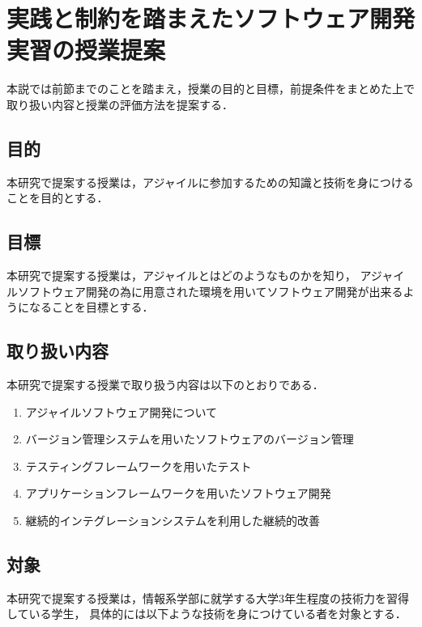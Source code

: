 \section{実践と制約を踏まえたソフトウェア開発実習の授業提案}

本説では前節までのことを踏まえ，授業の目的と目標，前提条件をまとめた上で取り扱い内容と授業の評価方法を提案する．

\subsection{目的}

本研究で提案する授業は，アジャイルに参加するための知識と技術を身につけることを目的とする．

\subsection{目標}

本研究で提案する授業は，アジャイルとはどのようなものかを知り， アジャイルソフトウェア開発の為に用意された環境を用いてソフトウェア開発が出来るようになることを目標とする．

\subsection{取り扱い内容
  \label{tech-content}
}

本研究で提案する授業で取り扱う内容は以下のとおりである．

\begin{enumerate}
  \item アジャイルソフトウェア開発について
  \item バージョン管理システムを用いたソフトウェアのバージョン管理
  \item テスティングフレームワークを用いたテスト
  \item アプリケーションフレームワークを用いたソフトウェア開発
  \item 継続的インテグレーションシステムを利用した継続的改善
\end{enumerate}

\subsection{対象 \label{target}}

本研究で提案する授業は，情報系学部に就学する大学3年生程度の技術力を習得している学生，
具体的には以下ような技術を身につけている者を対象とする．

